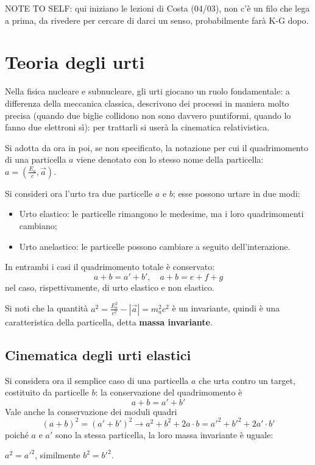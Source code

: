 \newpage
NOTE TO SELF: qui iniziano le lezioni di Costa (04/03), non c'è un filo che lega a prima,
da rivedere per cercare di darci un senso, probabilmente farà K-G dopo.
\section{Teoria degli urti}
Nella fisica nucleare e subnucleare, gli urti giocano un ruolo fondamentale:
a differenza della meccanica classica, descrivono dei processi in maniera molto
precisa (quando due biglie collidono non sono davvero puntiformi, quando lo fanno due
elettroni sì): per trattarli si userà la cinematica relativistica.

Si adotta da ora in poi, se non specificato, la notazione per cui il quadrimomento di una
particella $ a $  viene denotato con lo stesso nome della particella:
$ a = (\frac{E_a}{c},\vec{a}) $.

Si consideri ora l'urto tra due particelle $ a $ e $ b $; esse possono urtare in due modi: 
\begin{itemize}
    \item Urto elastico: le particelle rimangono le medesime, ma i loro quadrimomenti cambiano;	
    \item Urto anelastico: le particelle possono cambiare a seguito dell'interazione.
\end{itemize}
In entrambi i casi il quadrimomento totale è conservato:
$$ a + b = a' + b',\quad a + b = e + f + g $$ 
nel caso, rispettivamente, di urto elastico e non elastico.

Si noti che la quantità $ a^2 = \frac{E_a^2}{c^2} - |\vec{a}| = m_a^2c^2$ è un invariante,
quindi è una caratteristica della particella, detta \textbf{massa invariante}.

\subsection{Cinematica degli urti elastici}
Si considera ora il semplice caso di una particella $ a $ che urta contro un target, costituito
da particelle $ b $: la conservazione del quadrimomento è
$$ a + b = a' + b' $$
Vale anche la conservazione dei moduli quadri
$$ (a+b)^2 = (a'+b')^2 \rightarrow a^2 + b^2 +2a\cdot b =a'^2 + b'^2 +2a'\cdot b' $$
poiché $ a $ e $ a' $ sono la stessa particella, la loro massa invariante è uguale:

$a^2 = a'^2$, similmente $b^2 = b'^2$.
